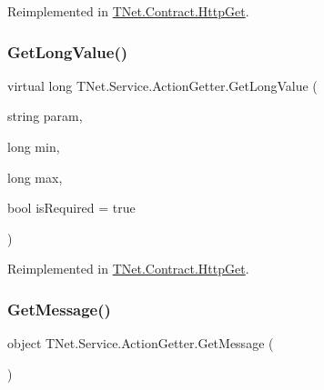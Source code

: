 Reimplemented in \mbox{\hyperlink{class_t_net_1_1_contract_1_1_http_get_abc50337872a82cb2ae04e19d3fc5032a}{T\+Net.\+Contract.\+Http\+Get}}.

\mbox{\label{class_t_net_1_1_service_1_1_action_getter_acb9c5bcf560bbfa55f3db6bb6d47586e}} 
\subsubsection{\texorpdfstring{Get\+Long\+Value()}{GetLongValue()}\hspace{0.1cm}{\footnotesize\ttfamily [2/2]}}
{\footnotesize\ttfamily virtual long T\+Net.\+Service.\+Action\+Getter.\+Get\+Long\+Value (\begin{DoxyParamCaption}\item[{string}]{param,  }\item[{long}]{min,  }\item[{long}]{max,  }\item[{bool}]{is\+Required = {\ttfamily true} }\end{DoxyParamCaption})\hspace{0.3cm}{\ttfamily [virtual]}}







Reimplemented in \mbox{\hyperlink{class_t_net_1_1_contract_1_1_http_get_a0dc96936421b99f52d03571a71c9e4e4}{T\+Net.\+Contract.\+Http\+Get}}.

\mbox{\label{class_t_net_1_1_service_1_1_action_getter_a4c526c4898248f3a804d8e49d9450c84}} 
\subsubsection{\texorpdfstring{Get\+Message()}{GetMessage()}}
{\footnotesize\ttfamily object T\+Net.\+Service.\+Action\+Getter.\+Get\+Message (\begin{DoxyParamCaption}{ }\end{DoxyParamCaption})}



